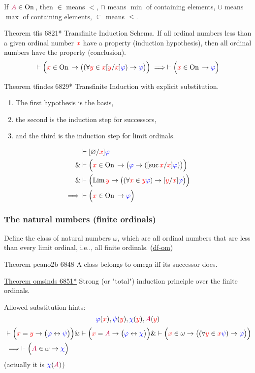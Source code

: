 \documentclass[12pt, letterpaper]{article}
\makeatletter
\newcommand{\unionsym}{\cup}
\newcommand{\interssym}{\cap}
\newcommand\ie{i.e\@ifnextchar.{}{.\@}}
\newcommand{\red}[1]{{\color{red} #1}}
\newcommand{\blue}[1]{{\color{blue} #1}}
\newcommand{\purple}[1]{{\color{purple} #1}}
\renewcommand{\emptyset}{\varnothing}
\newcommand{\provable}{\vdash}
\newcommand{\ra}{\rightarrow}
\newcommand{\lra}{\leftrightarrow}
\newcommand{\setvar}{\red}
\newcommand{\wff}{\blue}
\newcommand{\classvar}{\purple}
\newcommand{\wffphi}{\wff{\varphi}}
\newcommand{\wffpsi}{\wff{\psi}}
\newcommand{\wffchi}{\wff{\chi}}
\newcommand{\sx}{\setvar{x}}
\newcommand{\sy}{\setvar{y}}
\newcommand{\clA}{\classvar{A}}
\newcommand{\suc}{{\operatorname{suc}\,}}
\newcommand{\Lim}{{\operatorname{Lim}\,}}
\newcommand{\On}{{\operatorname{On}\,}}
\theoremstyle{definition}
\theoremstyle{remark}
\theoremstyle{definition}
\theoremstyle{plain}
\makeatother
\begin{document}
	\blue{If $\clA \in \On$, then $\in$ means $<$, $\interssym$ means $\min$ of containing elements, $\unionsym$ means $\max$ of containing elements, $\subseteq$ means $\le$.}
	
	Theorem	tfis 6821*	Transfinite Induction Schema.
	If all ordinal numbers less than a given ordinal number $\sx$ have a property (induction hypothesis),
	then all ordinal numbers have the property (conclusion).
	\[\provable\Big(\sx\in\On \ra \big((\forall\sy\in\sx[\sy/\sx]\wffphi)\ra\wffphi\big) \Big)\implies\provable\Big(\sx\in\On\ra\wffphi\Big) \]
	
	Theorem	tfindes 6829*	Transfinite Induction with explicit substitution.
	\begin{enumerate}
		\item The first hypothesis is the basis,
		\item the second is the induction step for successors, 
		\item and the third is the induction step for limit ordinals.
	\end{enumerate}
	\[\begin{aligned}
		&\provable[\emptyset/\sx]\wffphi \\
		\& &\provable \Big(\sx\in\On\ra \big(\wffphi\ra([\suc\sx/\sx]\wffphi)\big) \Big)\\
		\& &
		\provable \Big(\Lim\sy\ra\big((\forall\sx\in\sy\wffphi) \ra[\sy/\sx]\wffphi\big)\Big)\\
		\implies&
		\provable\Big(\sx\in\On\ra\wffphi\Big)
	\end{aligned} \]
	
	\subsubsection{The natural numbers (finite ordinals)}
	
	Define the class of natural numbers $\omega$,
	which are all ordinal numbers that are less than every limit ordinal, \ie, all finite ordinals.
	(\href{http://us.metamath.org/mpeuni/mmtheorems69.html#mm6832s}{df-om})
	
	Theorem	peano2b 6848	A class belongs to omega iff its successor does. 
	
	\href{http://us.metamath.org/mpeuni/omsinds.html}{Theorem	omsinds 6851*}	Strong (or "total") induction principle over the finite ordinals.
	
	Allowed substitution hints:   \[\wffphi(\sx),   \wffpsi(\sy) ,  \wffchi(\sy)  , \clA(\sy)\]
	\[\begin{aligned}
		&\provable \Big(\sx=\sy\ra\big(\wffphi\lra\wffpsi\big) \Big)
		\& \provable \Big( \sx=\clA \ra \big(\wffphi\lra\wffchi
		\big)\Big) \&
		\provable \Big( \sx\in\omega \ra \big( (\forall\sy\in\sx\wffpsi)\ra\wffphi\big)\Big)\\
		&\implies
		\provable \Big(\clA\in\omega\ra\wffchi\Big)
	\end{aligned}
	\]
	(actually it is $\wffchi(\clA)$)
	
\end{document}
